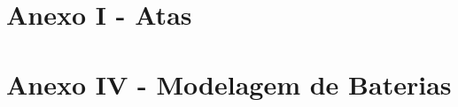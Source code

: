 \appendix
\section{Anexo I - Atas} 
\label{Atas} 
%



\appendix
\section{Anexo IV - Modelagem de Baterias} 
\label{App:AppendixModelagemBateria} 








